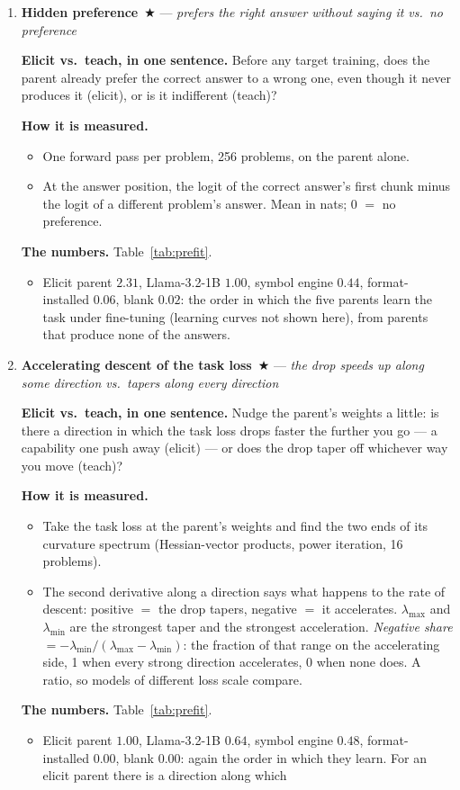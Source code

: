 \documentclass[11pt]{article}
\newcommand{\what}[1]{\par\noindent\textbf{Elicit vs.\ teach, in one sentence.} #1}
\newcommand{\how}[1]{\par\noindent\textbf{How it is measured.} #1}
\newcommand{\numbers}[1]{\par\noindent\textbf{The numbers.} #1\par\medskip}
\newenvironment{steps}{\begin{itemize}[nosep,leftmargin=1.2em,topsep=2pt]}{\end{itemize}}
\newcommand{\metricsecp}[2]{\item \textbf{#1}~$\bigstar$ --- \emph{#2}}
\begin{document}
\begin{enumerate}[label=\textbf{M\arabic*}, leftmargin=*, itemsep=1.2em, resume]
\metricsecp{Hidden preference}{prefers the right answer without saying it vs.\ no preference}
\what{Before any target training, does the parent already prefer the correct answer to a wrong
one, even though it never produces it (elicit), or is it indifferent (teach)?}
\how{
\begin{steps}
\item One forward pass per problem, 256 problems, on the parent alone.
\item At the answer position, the logit of the correct answer's first chunk minus the logit of a
different problem's answer. Mean in nats; 0 $=$ no preference.
\end{steps}}
\numbers{Table~\ref{tab:prefit}.
\begin{steps}
\item Elicit parent $2.31$, Llama-3.2-1B $1.00$, symbol engine $0.44$, format-installed $0.06$,
blank $0.02$: the order in which the five parents learn the task under fine-tuning (learning
curves not shown here), from parents that produce none of the answers.
\end{steps}}
\metricsecp{Accelerating descent of the task loss}{the drop speeds up along some direction vs.\ tapers along every direction}
\what{Nudge the parent's weights a little: is there a direction in which the task loss drops
faster the further you go --- a capability one push away (elicit) --- or does the drop taper off
whichever way you move (teach)?}
\how{
\begin{steps}
\item Take the task loss at the parent's weights and find the two ends of its curvature
spectrum (Hessian-vector products, power iteration, 16 problems).
\item The second derivative along a direction says what happens to the rate of descent:
positive $=$ the drop tapers, negative $=$ it accelerates. $\lambda_{\max}$ and $\lambda_{\min}$
are the strongest taper and the strongest acceleration. \emph{Negative share}
$=-\lambda_{\min}/(\lambda_{\max}-\lambda_{\min})$: the fraction of that range on the
accelerating side, 1 when every strong direction accelerates, 0 when none does. A ratio, so
models of different loss scale compare.
\end{steps}}
\numbers{Table~\ref{tab:prefit}.
\begin{steps}
\item Elicit parent $1.00$, Llama-3.2-1B $0.64$, symbol engine $0.48$, format-installed $0.00$,
blank $0.00$: again the order in which they learn. For an elicit parent there is a direction along which

\end{steps}}
\end{enumerate}
\end{document}
